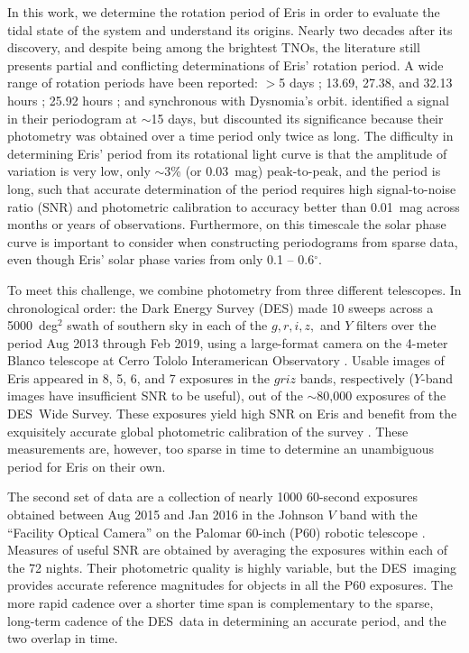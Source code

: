 \documentclass[onecolumn]{aastex631}
\newcommand{\des}{DES}
\begin{document}
In this work, we determine the rotation period of Eris in order to evaluate the tidal state of the system and understand its origins. Nearly two decades after its discovery, and despite being among the brightest TNOs, the literature still presents partial and conflicting determinations of Eris' rotation period. A wide range of rotation periods have been reported: $>$5 days \citep{Carraro2006}; 13.69, 27.38, and 32.13 hours \citep{Duffard2008}; 25.92 hours \citep{Roe2008}; and synchronous with Dysnomia's orbit\citep{RO2014,szakats}. \citet{Roe2008} identified a signal in their periodogram at $\sim$15 days, but discounted its significance because their photometry was obtained over a time period only twice as long.  The difficulty in determining Eris' period from its rotational light curve is that the amplitude of variation is very low, only $\sim$3\% (or 0.03~mag) peak-to-peak, and the period is long, such that accurate determination of the period requires high signal-to-noise ratio (SNR) and photometric calibration to accuracy better than 0.01~mag across months or years of observations. Furthermore, on this timescale the solar phase curve is important to consider when constructing periodograms from sparse data, even though Eris' solar phase varies from only 0.1 -- 0.6$^{\circ}$.

To meet this challenge, we combine photometry from three different telescopes. In chronological order: the Dark Energy Survey (\des) made 10 sweeps across a 5000~deg$^2$ swath of southern sky in each of the $g, r, i, z,$ and $Y$ filters over the period Aug 2013 through Feb 2019, using a large-format camera on the 4-meter Blanco telescope at Cerro Tololo Interamerican Observatory \citep{desdr2}. Usable images of Eris appeared in 8, 5, 6, and 7 exposures in the $griz$ bands, respectively ($Y$-band images have insufficient SNR to be useful), out of the $\sim$80,000 exposures of the \des\ Wide Survey. These exposures yield high SNR on Eris and benefit from the exquisitely accurate global photometric calibration of the survey \citep{fgcm}. These measurements are, however, too sparse in time to determine an unambiguous period for Eris on their own.

The second set of data are a collection of nearly 1000 60-second exposures obtained between Aug 2015 and Jan 2016 in the Johnson $V$ band with the ``Facility Optical Camera'' on the Palomar 60-inch (P60) robotic telescope \citep{Cenko2006}. Measures of useful SNR are obtained by averaging the exposures within each of the 72 nights. Their photometric quality is highly variable, but the \des\ imaging provides accurate reference magnitudes for objects in all the P60 exposures. The more rapid cadence over a shorter time span is complementary to the sparse, long-term cadence of the \des\ data in determining an accurate period, and the two overlap in time.
\end{document}

